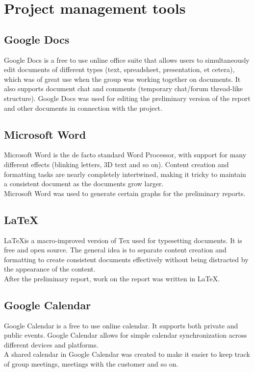 \section{Project management tools}
\subsection{Google Docs}
Google Docs is a free to use online office suite that allows users to simultaneously edit documents of different types (text, spreadsheet, presentation, et cetera), which was of great use when the group was working together on documents. It also supports document chat and comments (temporary chat/forum thread-like structure). Google Docs was used for editing the preliminary version of the report and other documents in connection with the project.

\subsection{Microsoft Word}
Microsoft Word is the de facto standard Word Processor, with support for many different effects (blinking letters, 3D text and so on). Content creation and formatting tasks are nearly completely intertwined, making it tricky to maintain a consistent document as the documents grow larger.\\
Microsoft Word was used to generate certain graphs for the preliminary reports.

\subsection{\LaTeX}
\LaTeX is a macro-improved version of Tex used for typesetting documents. It is free and open source. The general idea is to separate content creation and formatting to create consistent documents effectively without being distracted by the appearance of the content.\\
After the preliminary report, work on the report was written in \LaTeX.

\subsection{Google Calendar}
Google Calendar is a free to use online calendar. It supports both private and public events. Google Calendar allows for simple calendar synchronization across different devices and platforms.\\
A shared calendar in Google Calendar was created to make it easier to keep track of group meetings, meetings with the customer and so on.

